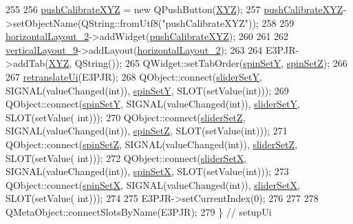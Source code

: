 \begin{DoxyCode}
255 
256         \hyperlink{class_ui___e3_p_j_r_a0a82bc71b94b2c607f872cbcf936811a}{pushCalibrateXYZ} = \textcolor{keyword}{new} QPushButton(\hyperlink{class_ui___e3_p_j_r_a098a80b873d9e0a09fd834f09e5028b4}{XYZ});
257         \hyperlink{class_ui___e3_p_j_r_a0a82bc71b94b2c607f872cbcf936811a}{pushCalibrateXYZ}->setObjectName(QString::fromUtf8(\textcolor{stringliteral}{"pushCalibrateXYZ"}));
258 
259         \hyperlink{class_ui___e3_p_j_r_a535a43287b7a5605cfc11580d146d3fb}{horizontalLayout\_2}->addWidget(\hyperlink{class_ui___e3_p_j_r_a0a82bc71b94b2c607f872cbcf936811a}{pushCalibrateXYZ});
260 
261 
262         \hyperlink{class_ui___e3_p_j_r_a7c00a0b53a83fa0709131b996a6249a9}{verticalLayout\_9}->addLayout(\hyperlink{class_ui___e3_p_j_r_a535a43287b7a5605cfc11580d146d3fb}{horizontalLayout\_2});
263 
264         E3PJR->addTab(\hyperlink{class_ui___e3_p_j_r_a098a80b873d9e0a09fd834f09e5028b4}{XYZ}, QString());
265         QWidget::setTabOrder(\hyperlink{class_ui___e3_p_j_r_a855f6972ba1dc6a61308080e1dea2447}{spinSetY}, \hyperlink{class_ui___e3_p_j_r_a1c5f1bef8dc94bae1a91139a37d1d881}{spinSetZ});
266 
267         \hyperlink{class_ui___e3_p_j_r_ab4d1867d3517a19d5b74c57ffd921202}{retranslateUi}(E3PJR);
268         QObject::connect(\hyperlink{class_ui___e3_p_j_r_afc14eb4b41f896c3881b1f3f86ebb5ab}{sliderSetY}, SIGNAL(valueChanged(\textcolor{keywordtype}{int})), 
      \hyperlink{class_ui___e3_p_j_r_a855f6972ba1dc6a61308080e1dea2447}{spinSetY}, SLOT(setValue(\textcolor{keywordtype}{int})));
269         QObject::connect(\hyperlink{class_ui___e3_p_j_r_a855f6972ba1dc6a61308080e1dea2447}{spinSetY}, SIGNAL(valueChanged(\textcolor{keywordtype}{int})), \hyperlink{class_ui___e3_p_j_r_afc14eb4b41f896c3881b1f3f86ebb5ab}{sliderSetY}, SLOT(setValue(\textcolor{keywordtype}{
      int})));
270         QObject::connect(\hyperlink{class_ui___e3_p_j_r_a6ef8bc7a96e71c14d44d1573f43506d4}{sliderSetZ}, SIGNAL(valueChanged(\textcolor{keywordtype}{int})), 
      \hyperlink{class_ui___e3_p_j_r_a1c5f1bef8dc94bae1a91139a37d1d881}{spinSetZ}, SLOT(setValue(\textcolor{keywordtype}{int})));
271         QObject::connect(\hyperlink{class_ui___e3_p_j_r_a1c5f1bef8dc94bae1a91139a37d1d881}{spinSetZ}, SIGNAL(valueChanged(\textcolor{keywordtype}{int})), \hyperlink{class_ui___e3_p_j_r_a6ef8bc7a96e71c14d44d1573f43506d4}{sliderSetZ}, SLOT(setValue(\textcolor{keywordtype}{
      int})));
272         QObject::connect(\hyperlink{class_ui___e3_p_j_r_ac45c355780da0c571a472ccb5f74c977}{sliderSetX}, SIGNAL(valueChanged(\textcolor{keywordtype}{int})), 
      \hyperlink{class_ui___e3_p_j_r_ab782845855d3c29e2d229ff09b717771}{spinSetX}, SLOT(setValue(\textcolor{keywordtype}{int})));
273         QObject::connect(\hyperlink{class_ui___e3_p_j_r_ab782845855d3c29e2d229ff09b717771}{spinSetX}, SIGNAL(valueChanged(\textcolor{keywordtype}{int})), \hyperlink{class_ui___e3_p_j_r_ac45c355780da0c571a472ccb5f74c977}{sliderSetX}, SLOT(setValue(\textcolor{keywordtype}{
      int})));
274 
275         E3PJR->setCurrentIndex(0);
276 
277 
278         QMetaObject::connectSlotsByName(E3PJR);
279     \} \textcolor{comment}{// setupUi}
\end{DoxyCode}


